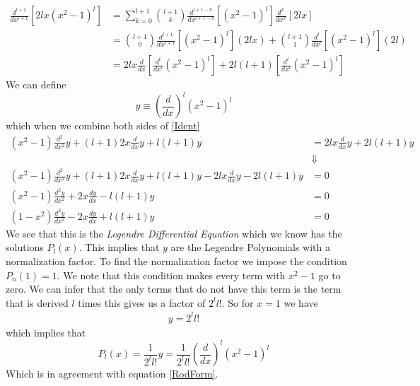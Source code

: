 \documentclass[11pt]{article}
\numberwithin{equation}{section}
\begin{document}
\begin{align*}
\frac{d^{l+1}}{dx^{l+1}}\left[2lx(x^2-1)^l\right] &= \sum_{k=0}^{l+1}{l+1\choose{k}}\frac{d^{l+1-k}}{dx^{l+1-k}}\left[(x^2-1)^l\right]\frac{d^k}{dx^k}\left[2lx\right]\\
&= {l+1\choose{0}}\frac{d^{l+1}}{dx^{l+1}}\left[(x^2-1)^l\right](2lx)
 + {l+1\choose{1}}\frac{d^{l}}{dx^{l}}\left[(x^2-1)^l\right](2l)\\
&= 2lx\frac{d}{dx}\left[\frac{d^l}{dx^l}(x^2-1)^l\right]
 + 2l(l+1)\left[\frac{d^{l}}{dx^{l}}(x^2-1)^l\right]
\end{align*}
We can define
$$y \equiv \left(\frac{d}{dx}\right)^l(x^2-1)^l$$
which when we combine both sides of \ref{Ident}
\begin{align*}
\left(x^2-1\right)\frac{d^{2}}{dx^{2}}y+(l+1)2x\frac{d}{dx}y + l(l+1)y &= 2lx\frac{d}{dx}y + 2l(l+1)y\\
&\Downarrow\\
\left(x^2-1\right)\frac{d^{2}}{dx^{2}}y+(l+1)2x\frac{d}{dx}y + l(l+1)y - 2lx\frac{d}{dx}y - 2l(l+1)y &=0\\
\left(x^2-1\right)\frac{d^{2}y}{dx^{2}} + 2x\frac{dy}{dx} - l(l+1)y &=0\\
\left(1-x^2\right)\frac{d^{2}y}{dx^{2}} - 2x\frac{dy}{dx} + l(l+1)y &=0
\end{align*}
We see that this is the \emph{Legendre Differential Equation} which we know has the 
solutions $P_l(x)$. This implies that $y$ are the Legendre Polynomials with a normalization 
factor. To find the normalization factor we impose the condition $P_n(1) = 1$. We note that 
this condition makes every term with $x^2-1$ go to zero. We can infer that the only terms 
that do not have this term is the term that is derived $l$ times this gives us a factor of
$2^ll!$. So for $x=1$ we have
\begin{align*}
y = {2^ll!}
\end{align*}
which implies that 
$$P_l(x) = \frac{1}{2^ll!}y = \frac{1}{2^ll!}\left(\frac{d}{dx}\right)^l(x^2-1)^l$$
Which is in agreement with equation \ref{RodForm}.


\pagebreak
\end{document}
